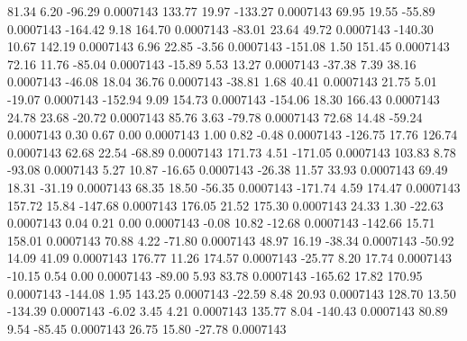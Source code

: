        81.34        6.20      -96.29     0.0007143
      133.77       19.97     -133.27     0.0007143
       69.95       19.55      -55.89     0.0007143
     -164.42        9.18      164.70     0.0007143
      -83.01       23.64       49.72     0.0007143
     -140.30       10.67      142.19     0.0007143
        6.96       22.85       -3.56     0.0007143
     -151.08        1.50      151.45     0.0007143
       72.16       11.76      -85.04     0.0007143
      -15.89        5.53       13.27     0.0007143
      -37.38        7.39       38.16     0.0007143
      -46.08       18.04       36.76     0.0007143
      -38.81        1.68       40.41     0.0007143
       21.75        5.01      -19.07     0.0007143
     -152.94        9.09      154.73     0.0007143
     -154.06       18.30      166.43     0.0007143
       24.78       23.68      -20.72     0.0007143
       85.76        3.63      -79.78     0.0007143
       72.68       14.48      -59.24     0.0007143
        0.30        0.67        0.00     0.0007143
        1.00        0.82       -0.48     0.0007143
     -126.75       17.76      126.74     0.0007143
       62.68       22.54      -68.89     0.0007143
      171.73        4.51     -171.05     0.0007143
      103.83        8.78      -93.08     0.0007143
        5.27       10.87      -16.65     0.0007143
      -26.38       11.57       33.93     0.0007143
       69.49       18.31      -31.19     0.0007143
       68.35       18.50      -56.35     0.0007143
     -171.74        4.59      174.47     0.0007143
      157.72       15.84     -147.68     0.0007143
      176.05       21.52      175.30     0.0007143
       24.33        1.30      -22.63     0.0007143
        0.04        0.21        0.00     0.0007143
       -0.08       10.82      -12.68     0.0007143
     -142.66       15.71      158.01     0.0007143
       70.88        4.22      -71.80     0.0007143
       48.97       16.19      -38.34     0.0007143
      -50.92       14.09       41.09     0.0007143
      176.77       11.26      174.57     0.0007143
      -25.77        8.20       17.74     0.0007143
      -10.15        0.54        0.00     0.0007143
      -89.00        5.93       83.78     0.0007143
     -165.62       17.82      170.95     0.0007143
     -144.08        1.95      143.25     0.0007143
      -22.59        8.48       20.93     0.0007143
      128.70       13.50     -134.39     0.0007143
       -6.02        3.45        4.21     0.0007143
      135.77        8.04     -140.43     0.0007143
       80.89        9.54      -85.45     0.0007143
       26.75       15.80      -27.78     0.0007143
